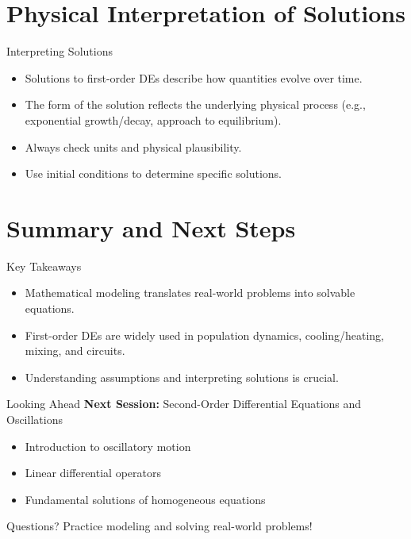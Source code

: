 \documentclass[10pt,aspectratio=169]{beamer}
\begin{document}
\section{Physical Interpretation of Solutions}
\begin{frame}{Interpreting Solutions}
    \begin{itemize}
        \item Solutions to first-order DEs describe how quantities evolve over time.
        \item The form of the solution reflects the underlying physical process (e.g., exponential growth/decay, approach to equilibrium).
        \item Always check units and physical plausibility.
        \item Use initial conditions to determine specific solutions.
    \end{itemize}
\end{frame}

\section{Summary and Next Steps}
\begin{frame}{Key Takeaways}
    \begin{itemize}
        \item Mathematical modeling translates real-world problems into solvable equations.
        \item First-order DEs are widely used in population dynamics, cooling/heating, mixing, and circuits.
        \item Understanding assumptions and interpreting solutions is crucial.
    \end{itemize}
\end{frame}

\begin{frame}{Looking Ahead}
    \textbf{Next Session:} Second-Order Differential Equations and Oscillations
    \begin{itemize}
        \item Introduction to oscillatory motion
        \item Linear differential operators
        \item Fundamental solutions of homogeneous equations
    \end{itemize}
\end{frame}

\begin{frame}[standout]
    Questions?\newline
    Practice modeling and solving real-world problems!
\end{frame}
\end{document}
